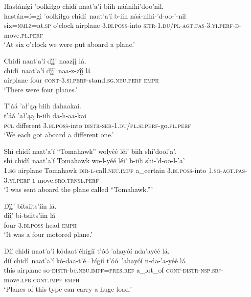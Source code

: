 \ea\label{ex:text9-2-4}
Hastánígi ’oolkiłgo chidí naat’a’í biih náánihi’doo’nil.\\
\gll hastán=í=gi	’oolkiłgo	chidí~{naat’a’í}	b-iih	náá-nihi-’d-oo-’-nil\\
     six=\textsc{nmlz}=at.\textsc{sp}	o'clock	airplane	3.\textsc{bi}.\textsc{poss}-into	\textsc{sitr}-1.\textsc{du}/\textsc{pl}-\textsc{agt}.\textsc{pas}-3.\textsc{yi}.\textsc{perf}-\textsc{d}-move.\textsc{pl}.\textsc{perf}\\
\glt `At six o'clock we were put aboard a plane.'
\z

\ea\label{ex:text9-2-5}
Chidí naat’a’í dį́į́’ naazį́į́ lá.\\
\gll chidí~{naat’a’í}	dį́į́’	naa-z-zį́į́	lá\\
     airplane	four	\textsc{cont}-3.\textsc{si}.\textsc{perf}-stand.\textsc{sg}.\textsc{neu}.\textsc{perf}	\textsc{emph}\\
\glt `There were four planes.'
\z

\ea\label{ex:text9-2-6}
T’áá ’ał’ąą biih dahaakai.\\
\gll t’áá	’ał’ąą	b-iih	da-h-aa-kai\\
     \textsc{pcl}	different	3.\textsc{bi}.\textsc{poss}-into	\textsc{distr}-\textsc{ser}-1.\textsc{du}/\textsc{pl}.\textsc{si}.\textsc{perf}-go.\textsc{pl}.\textsc{perf}\\
\glt `We each got aboard a different one.'
\z

\ea\label{ex:text9-2-7}
Shí chidí naat’a’í ``Tomahawk'' wolyéé léi’ biih shi’dool’a’.\\
\gll shí	chidí~{naat’a’í}	Tomahawk	wo-l-yéé	léi’	b-iih	shi-’d-oo-l-’a’\\
     1.\textsc{sg}	airplane	Tomahawk	\textsc{dir}-\textsc{l}-call.\textsc{neu}.\textsc{impf}	a\_certain	3.\textsc{bi}.\textsc{poss}-into	1.\textsc{sg}-\textsc{agt}.\textsc{pas}-3.\textsc{yi}.\textsc{perf}-\textsc{l}-move.\textsc{sro}.\textsc{trnsl}.\textsc{perf}\\
\glt `I was sent aboard the plane called ``Tomahawk.'''
\z

\newpage
\ea\label{ex:text9-2-8}
Dį́į́’ bitsiits’iin lá.\\
\gll dį́į́’	bi-tsiits’iin	lá\\
     four	3.\textsc{bi}.\textsc{poss}-head	\textsc{emph}\\
\glt `It was a four motored plane.'
\z

\ea\label{ex:text9-2-9}
Díí chidí naat’a’í kódaat’éhígíí t’óó ’ahayóí nda’ayéé lá.\\
\gll díí	chidí~{naat’a’í}	kó-daa-t’é=hígíí	t’óó~{’ahayóí}	n-da-’a-yéé	lá\\
     this	airplane	so-\textsc{distr}-be.\textsc{neu}.\textsc{impf}=\textsc{pres}.\textsc{ref}	a\_lot\_of	\textsc{cont}-\textsc{distr}-\textsc{nsp}.\textsc{sbj}-move.\textsc{lpb}.\textsc{cont}.\textsc{impf}	\textsc{emph}\\
\glt `Planes of this type can carry a huge load.'
\z


